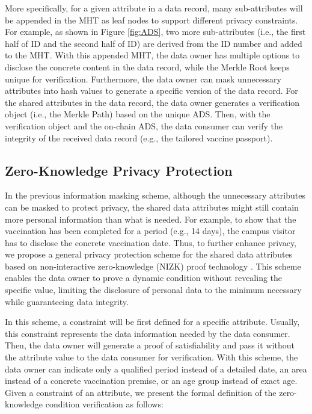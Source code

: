 \documentclass[11pt,divpdfm]{article}
\begin{document}
More specifically, for a given attribute in a data record, many sub-attributes will be appended in the MHT as leaf nodes to support different privacy constraints.
For example, as shown in Figure \ref{fig:ADS}, two more sub-attributes (i.e., the first half of ID and the second half of ID) are derived from the ID number and added to the MHT.
With this appended MHT, the data owner has multiple options to disclose the concrete content in the data record, while the Merkle Root keeps unique for verification.
Furthermore, the data owner can mask unnecessary attributes into hash values to generate a specific version of the data record.
For the shared attributes in the data record, the data owner generates a verification object (i.e., the Merkle Path) based on the unique ADS.
Then, with the verification object and the on-chain ADS, the data consumer can verify the integrity of the received data record (e.g., the tailored vaccine passport).

\subsection{Zero-Knowledge Privacy Protection}
In the previous information masking scheme, although the unnecessary attributes can be masked to protect privacy, the shared data attributes might still contain more personal information than what is needed.
For example, to show that the vaccination has been completed for a period (e.g., 14 days), the campus visitor has to disclose the concrete vaccination date.
Thus, to further enhance privacy, we propose a general privacy protection scheme for the shared data attributes based on non-interactive zero-knowledge (NIZK) proof technology \cite{bootle2016efficient}.
This scheme enables the data owner to prove a dynamic condition without revealing the specific value, limiting the disclosure of personal data to the minimum necessary while guaranteeing data integrity.

In this scheme, a constraint will be first defined for a specific attribute.
Usually, this constraint represents the data information needed by the data consumer.
Then, the data owner will generate a proof of satisfiability and pass it without the attribute value to the data consumer for verification.
With this scheme, the data owner can indicate only a qualified period instead of a detailed date, an area instead of a concrete vaccination premise, or an age group instead of exact age.
Given a constraint of an attribute, we present the formal definition of the zero-knowledge condition verification as follows:
\end{document}
